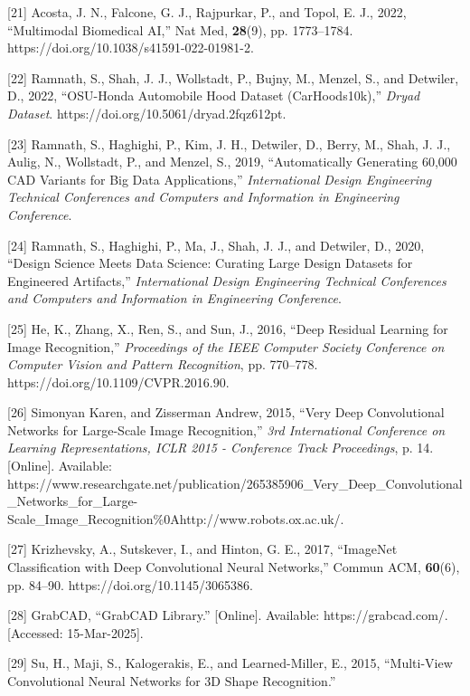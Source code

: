 \documentclass[11pt]{article}
\begin{document}
{[}21{]} Acosta, J. N., Falcone, G. J., Rajpurkar, P., and Topol, E. J.,
2022, ``Multimodal Biomedical AI,'' Nat Med, \textbf{28}(9), pp.
1773--1784. https://doi.org/10.1038/s41591-022-01981-2.

{[}22{]} Ramnath, S., Shah, J. J., Wollstadt, P., Bujny, M., Menzel, S.,
and Detwiler, D., 2022, ``OSU-Honda Automobile Hood Dataset
(CarHoods10k),'' \emph{Dryad Dataset}.
https://doi.org/10.5061/dryad.2fqz612pt.

{[}23{]} Ramnath, S., Haghighi, P., Kim, J. H., Detwiler, D., Berry, M.,
Shah, J. J., Aulig, N., Wollstadt, P., and Menzel, S., 2019,
``Automatically Generating 60,000 CAD Variants for Big Data
Applications,'' \emph{International Design Engineering Technical
Conferences and Computers and Information in Engineering Conference}.

{[}24{]} Ramnath, S., Haghighi, P., Ma, J., Shah, J. J., and Detwiler,
D., 2020, ``Design Science Meets Data Science: Curating Large Design
Datasets for Engineered Artifacts,'' \emph{International Design
Engineering Technical Conferences and Computers and Information in
Engineering Conference}.

{[}25{]} He, K., Zhang, X., Ren, S., and Sun, J., 2016, ``Deep Residual
Learning for Image Recognition,'' \emph{Proceedings of the IEEE Computer
Society Conference on Computer Vision and Pattern Recognition}, pp.
770--778. https://doi.org/10.1109/CVPR.2016.90.

{[}26{]} Simonyan Karen, and Zisserman Andrew, 2015, ``Very Deep
Convolutional Networks for Large-Scale Image Recognition,'' \emph{3rd
International Conference on Learning Representations, ICLR 2015 -
Conference Track Proceedings}, p. 14. {[}Online{]}. Available:
https://www.researchgate.net/publication/265385906\_Very\_Deep\_Convolutional\_Networks\_for\_Large-Scale\_Image\_Recognition\%0Ahttp://www.robots.ox.ac.uk/.

{[}27{]} Krizhevsky, A., Sutskever, I., and Hinton, G. E., 2017,
``ImageNet Classification with Deep Convolutional Neural Networks,''
Commun ACM, \textbf{60}(6), pp. 84--90. https://doi.org/10.1145/3065386.

{[}28{]} GrabCAD, ``GrabCAD Library.'' {[}Online{]}. Available:
https://grabcad.com/. {[}Accessed: 15-Mar-2025{]}.

{[}29{]} Su, H., Maji, S., Kalogerakis, E., and Learned-Miller, E.,
2015, ``Multi-View Convolutional Neural Networks for 3D Shape
Recognition.''

~
\end{document}

